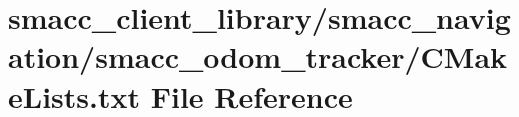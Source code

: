\hypertarget{client__library_2smacc__navigation_2smacc__odom__tracker_2CMakeLists_8txt}{}\section{smacc\+\_\+client\+\_\+library/smacc\+\_\+navigation/smacc\+\_\+odom\+\_\+tracker/\+C\+Make\+Lists.txt File Reference}
\label{client__library_2smacc__navigation_2smacc__odom__tracker_2CMakeLists_8txt}
